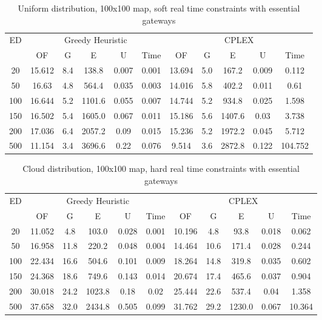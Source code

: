 \begin{table}[htb]
	\centering
	\begin{tabular}{|c|c|c|c|c|c|c|c|c|c|c|}
		\hline
		\multirow{2}{*}{ED} & \multicolumn{5}{c|}{Greedy Heuristic} & \multicolumn{5}{c|}{CPLEX}\\ 
		\cline{2-11}
& OF & G & E & U & Time & OF & G & E & U & Time\\ 
		\hline
		20 & 15.612 & 8.4 & 138.8 & 0.007 & 0.001 & 13.694 & 5.0 & 167.2 & 0.009 & 0.112 \\ 
		50 & 16.63 & 4.8 & 564.4 & 0.035 & 0.003 & 14.016 & 5.8 & 402.2 & 0.011 & 0.61 \\ 
		100 & 16.644 & 5.2 & 1101.6 & 0.055 & 0.007 & 14.744 & 5.2 & 934.8 & 0.025 & 1.598 \\ 
		150 & 16.502 & 5.4 & 1605.0 & 0.067 & 0.011 & 15.186 & 5.6 & 1407.6 & 0.03 & 3.738 \\ 
		200 & 17.036 & 6.4 & 2057.2 & 0.09 & 0.015 & 15.236 & 5.2 & 1972.2 & 0.045 & 5.712 \\ 
		500 & 11.154 & 3.4 & 3696.6 & 0.22 & 0.076 & 9.514 & 3.6 & 2872.8 & 0.122 & 104.752 \\ 
		\hline 
	\end{tabular} 
	\caption{Uniform distribution, 100x100 map, soft real time constraints with essential gateways} 
	\label{tab:unif_soft_esc_100} 
\end{table} 

\begin{table}[htb]
	\centering
	\begin{tabular}{|c|c|c|c|c|c|c|c|c|c|c|}
		\hline
		\multirow{2}{*}{ED} & \multicolumn{5}{c|}{Greedy Heuristic} & \multicolumn{5}{c|}{CPLEX}\\ 
		\cline{2-11}
& OF & G & E & U & Time & OF & G & E & U & Time\\ 
		\hline
		20 & 11.052 & 4.8 & 103.0 & 0.028 & 0.001 & 10.196 & 4.8 & 93.8 & 0.018 & 0.062 \\ 
		50 & 16.958 & 11.8 & 220.2 & 0.048 & 0.004 & 14.464 & 10.6 & 171.4 & 0.028 & 0.244 \\ 
		100 & 22.434 & 16.6 & 504.6 & 0.101 & 0.009 & 18.264 & 14.8 & 319.8 & 0.035 & 0.602 \\ 
		150 & 24.368 & 18.6 & 749.6 & 0.143 & 0.014 & 20.674 & 17.4 & 465.6 & 0.037 & 0.904 \\ 
		200 & 30.018 & 24.2 & 1023.8 & 0.18 & 0.02 & 25.444 & 22.6 & 537.4 & 0.04 & 1.358 \\ 
		500 & 37.658 & 32.0 & 2434.8 & 0.505 & 0.099 & 31.762 & 29.2 & 1230.0 & 0.067 & 10.364 \\ 
		\hline 
	\end{tabular} 
	\caption{Cloud distribution, 100x100 map, hard real time constraints with essential gateways} 
	\label{tab:cloud_hard_esc_100} 
\end{table} 

